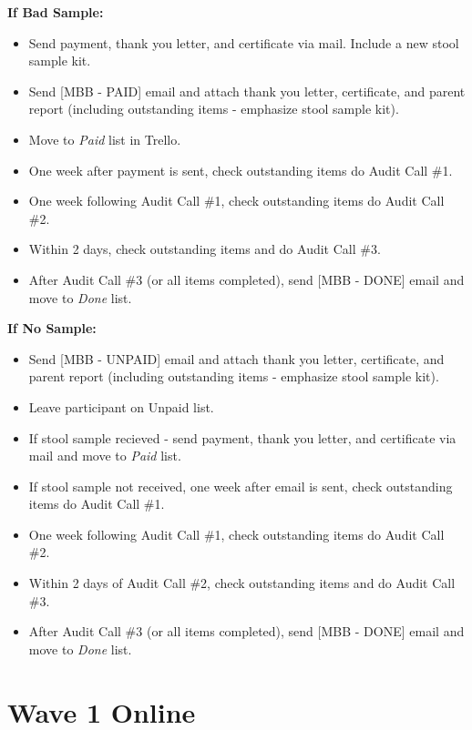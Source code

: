 \documentclass[]{book}
\providecommand{\tightlist}{%
  \setlength{\itemsep}{0pt}\setlength{\parskip}{0pt}}
\begin{document}
\textbf{If Bad Sample:}

\begin{itemize}
\tightlist
\item
  Send payment, thank you letter, and certificate via mail. Include a new stool sample kit.
\item
  Send {[}MBB - PAID{]} email and attach thank you letter, certificate, and parent report (including outstanding items - emphasize stool sample kit).
\item
  Move to \emph{Paid} list in Trello.
\item
  One week after payment is sent, check outstanding items do Audit Call \#1.
\item
  One week following Audit Call \#1, check outstanding items do Audit Call \#2.
\item
  Within 2 days, check outstanding items and do Audit Call \#3.
\item
  After Audit Call \#3 (or all items completed), send {[}MBB - DONE{]} email and move to \emph{Done} list.
\end{itemize}

\textbf{If No Sample:}

\begin{itemize}
\tightlist
\item
  Send {[}MBB - UNPAID{]} email and attach thank you letter, certificate, and parent report (including outstanding items - emphasize stool sample kit).
\item
  Leave participant on Unpaid list.
\item
  If stool sample recieved - send payment, thank you letter, and certificate via mail and move to \emph{Paid} list.
\item
  If stool sample not received, one week after email is sent, check outstanding items do Audit Call \#1.
\item
  One week following Audit Call \#1, check outstanding items do Audit Call \#2.
\item
  Within 2 days of Audit Call \#2, check outstanding items and do Audit Call \#3.
\item
  After Audit Call \#3 (or all items completed), send {[}MBB - DONE{]} email and move to \emph{Done} list.
\end{itemize}

\hypertarget{wave-1-online}{%
\chapter{Wave 1 Online}\label{wave-1-online}}
\end{document}
